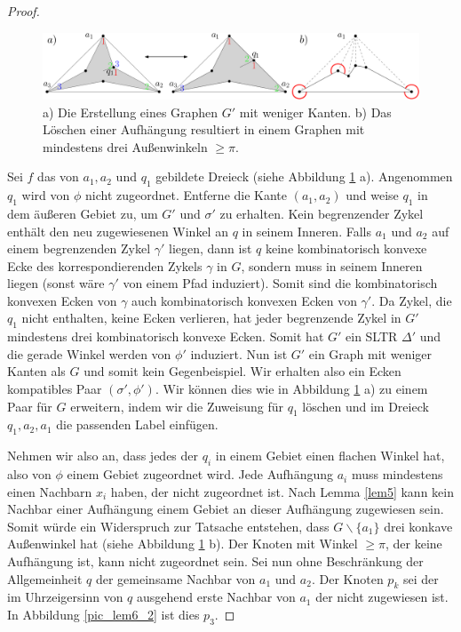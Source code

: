 \begin{proof}
\begin{figure}
	\centering
	  \includegraphics[width=1\textwidth]{lem6_1.png}
    	\caption{a) Die Erstellung eines Graphen $G'$ mit weniger Kanten. b) Das Löschen einer Aufhängung resultiert in einem Graphen mit mindestens drei Außenwinkeln $\geq \pi$.}
    	\label{pic_lem6_1}
\end{figure}

Sei $f$ das von $a_1,a_2$ und $q_1$ gebildete Dreieck (siehe Abbildung \ref{pic_lem6_1} a). Angenommen $q_1$ wird von $\phi$ nicht zugeordnet. Entferne die Kante $(a_1,a_2)$ und weise $q_1$ in dem äußeren Gebiet zu, um $G'$ und $\sigma'$ zu erhalten. Kein begrenzender Zykel enthält den neu zugewiesenen Winkel an $q$ in seinem Inneren. Falls $a_1$ und $a_2$ auf einem begrenzenden Zykel $\gamma'$ liegen, dann ist $q$ keine kombinatorisch konvexe Ecke des korrespondierenden Zykels $\gamma$ in $G$, sondern muss in seinem Inneren liegen (sonst wäre $\gamma'$ von einem Pfad induziert). Somit sind die kombinatorisch konvexen Ecken von $\gamma$ auch kombinatorisch konvexen Ecken von $\gamma'$. Da Zykel, die $q_1$ nicht enthalten, keine Ecken verlieren, hat jeder begrenzende Zykel in $G'$ mindestens drei kombinatorisch konvexe Ecken. Somit hat $G'$ ein SLTR $\Delta'$ und die gerade Winkel werden von $\phi'$ induziert. Nun ist $G'$ ein Graph mit weniger Kanten als $G$ und somit kein Gegenbeispiel. Wir erhalten also ein Ecken kompatibles Paar $(\sigma',\phi')$. Wir können dies wie in Abbildung \ref{pic_lem6_1} a) zu einem Paar für $G$ erweitern, indem wir die Zuweisung für $q_1$ löschen und im Dreieck $q_1,a_2,a_1$ die passenden Label einfügen.

Nehmen wir also an, dass jedes der $q_i$ in einem Gebiet einen flachen Winkel hat, also von $\phi$ einem Gebiet zugeordnet wird. Jede Aufhängung $a_i$ muss mindestens einen Nachbarn $x_i$ haben, der nicht zugeordnet ist. Nach Lemma \ref{lem5} kann kein Nachbar einer Aufhängung einem Gebiet an dieser Aufhängung zugewiesen sein. Somit würde ein Widerspruch zur Tatsache entstehen, dass $G\backslash \{a_1\}$ drei konkave Außenwinkel hat (siehe Abbildung \ref{pic_lem6_1} b). Der Knoten mit Winkel $\geq \pi$, der keine Aufhängung ist, kann nicht zugeordnet sein. Sei nun ohne Beschränkung der Allgemeinheit $q$ der gemeinsame Nachbar von $a_1$ und $a_2$. Der Knoten $p_k$ sei der im Uhrzeigersinn von $q$ ausgehend erste Nachbar von $a_1$ der nicht zugewiesen ist. In Abbildung \ref{pic_lem6_2} ist dies $p_3$.


\end{proof}
